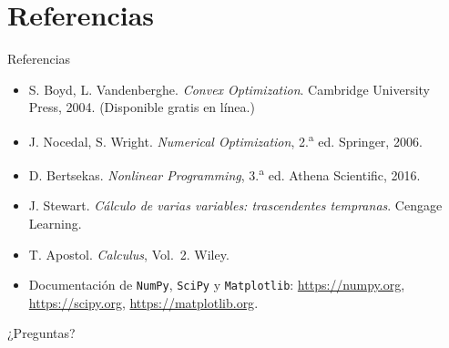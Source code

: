 \documentclass[aspectratio=169,10pt]{beamer}
\begin{document}
\section{Referencias}

\begin{frame}{Referencias}
  \footnotesize
  \begin{itemize}
    \item S. Boyd, L. Vandenberghe. \emph{Convex Optimization}. Cambridge
      University Press, 2004. (Disponible gratis en línea.)
    \item J. Nocedal, S. Wright. \emph{Numerical Optimization}, 2.\textsuperscript{a}
      ed. Springer, 2006.
    \item D. Bertsekas. \emph{Nonlinear Programming}, 3.\textsuperscript{a}
      ed. Athena Scientific, 2016.
    \item J. Stewart. \emph{Cálculo de varias variables: trascendentes
      tempranas}. Cengage Learning.
    \item T. Apostol. \emph{Calculus}, Vol.\ 2. Wiley.
    \item Documentación de \texttt{NumPy}, \texttt{SciPy} y
      \texttt{Matplotlib}: \url{https://numpy.org},
      \url{https://scipy.org}, \url{https://matplotlib.org}.
  \end{itemize}
\end{frame}

\begin{frame}[standout]
  ¿Preguntas?
\end{frame}
\end{document}
